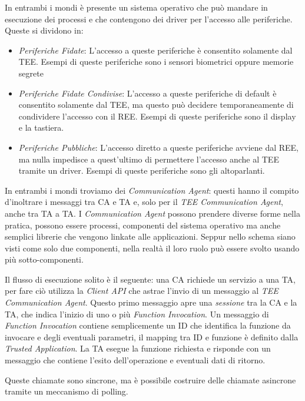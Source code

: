 \documentclass[12pt,italian]{report}
\begin{document}
In entrambi i mondi è presente un sistema operativo che può mandare in
esecuzione dei processi e che contengono dei driver per l'accesso alle
periferiche. Queste si dividono in:
\begin{itemize}
    \item \textit{Periferiche Fidate}: L'accesso a queste periferiche è
    consentito solamente dal TEE. Esempi di queste periferiche sono i
    sensori biometrici oppure memorie segrete %
    \item \textit{Periferiche Fidate Condivise}: L'accesso a queste
    periferiche di default è consentito solamente dal TEE, ma questo può
    decidere temporaneamente di condividere l'accesso con il REE. Esempi di
    queste periferiche sono il display e la tastiera.
    \item \textit{Periferiche Pubbliche}: L'accesso diretto a queste
    periferiche avviene dal REE, ma nulla impedisce a quest'ultimo di
    permettere l'accesso anche al TEE tramite un driver. Esempi di queste
    periferiche sono gli altoparlanti.
\end{itemize}

In entrambi i mondi troviamo dei \textit{Communication Agent}: questi 
hanno il compito d'inoltrare i messaggi tra CA e TA e, solo per il
\textit{TEE Communication Agent}, anche tra TA a TA.
I \textit{Communication Agent} possono prendere diverse forme nella pratica,
possono essere processi, componenti del sistema operativo ma anche semplici
librerie che vengono linkate alle applicazioni.
Seppur nello schema siano visti come solo due componenti, nella realtà il loro
ruolo può essere svolto usando più sotto-componenti.

Il flusso di esecuzione solito è il seguente: una CA richiede un servizio a
una TA, per fare ciò utilizza la \textit{Client API} che astrae l'invio di un
messaggio al \textit{TEE Communication Agent}.
Questo primo messaggio apre una \textit{sessione} tra la CA e la TA, che
indica l'inizio di uno o più \textit{Function Invocation}.
Un messaggio di \textit{Function Invocation} contiene semplicemente un ID
che identifica la funzione da invocare e degli eventuali parametri,
il mapping tra ID e funzione è definito dalla \textit{Trusted Application}.
La TA esegue la funzione richiesta e risponde con un messaggio che contiene
l'esito dell'operazione e eventuali dati di ritorno.

Queste chiamate sono sincrone, ma è possibile costruire delle chiamate
asincrone tramite un meccanismo di polling.
\end{document}
